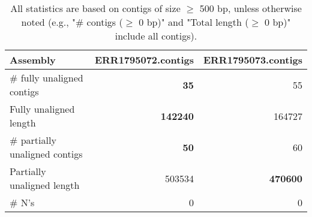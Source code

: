 \documentclass[12pt,a4paper]{article}
\begin{document}
\begin{table}[ht]
\begin{center}
\caption{All statistics are based on contigs of size $\geq$ 500 bp, unless otherwise noted (e.g., "\# contigs ($\geq$ 0 bp)" and "Total length ($\geq$ 0 bp)" include all contigs).}
\begin{tabular}{|l*{2}{|r}|}
\hline
Assembly & ERR1795072.contigs & ERR1795073.contigs \\ \hline
\# fully unaligned contigs & {\bf 35} & 55 \\ \hline
Fully unaligned length & {\bf 142240} & 164727 \\ \hline
\# partially unaligned contigs & {\bf 50} & 60 \\ \hline
Partially unaligned length & 503534 & {\bf 470600} \\ \hline
\# N's & 0 & 0 \\ \hline
\end{tabular}
\end{center}
\end{table}
\end{document}
